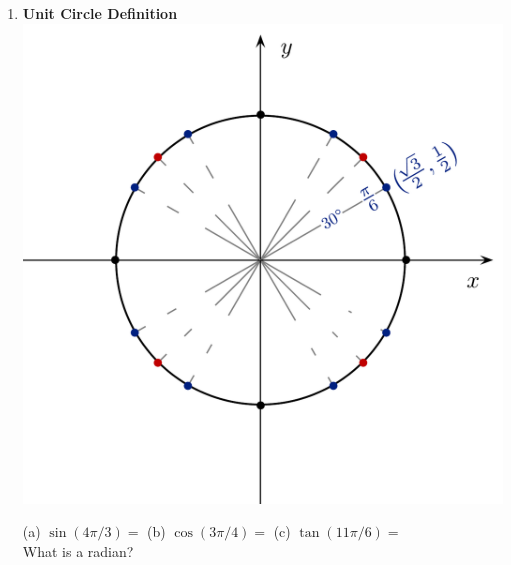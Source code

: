 \documentclass[11pt,fleqn]{article}
\begin{document}
\renewcommand{\headrulewidth}{0pt}
\newcommand{\blank}[1]{\rule{#1}{0.75pt}}
\renewcommand{\d}{\displaystyle}
\vspace*{-0.7in}
\begin{center}
  \large {}
\end{center}
\begin{enumerate}
\item \textbf{Unit Circle Definition}\\

\includegraphics[scale=.6]{blank-unit-circle}

\vfill

(a) $\sin(4 \pi/3)=$ \hfill (b) $\cos(3\pi/4)=$ \hfill (c) $\tan(11\pi/6)=$ \hspace{.8in}\quad\\
\vfill
What is a radian?\\

\vfill


\end{enumerate}
\end{document}
